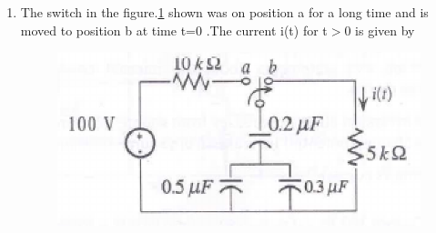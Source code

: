 \documentclass[journal,12pt,twocolumn]{IEEEtran}
\begin{document}
\begin{enumerate}
\item The switch in the figure.\ref{fig74} shown was on position a for a long time and is moved to position b at time t=0 .The current i(t) for t$>0$ is given by
\begin{enumerate}
\setlength\itemsep{2em}
\begin{figure}[!h]
\begin{center}
\includegraphics[scale=0.9]{./figs/fig74.eps}
\caption{}
\label{fig74}
\end{center}
\end{figure}
\end{enumerate}


\end{enumerate}
\end{document}
